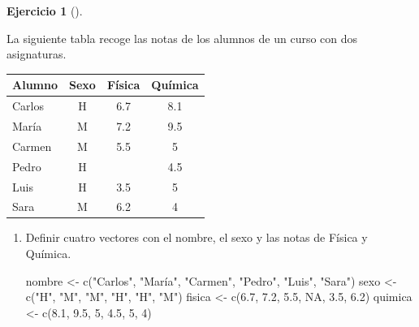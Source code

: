 \documentclass[
  a4paper,
]{scrreport}
\newenvironment{Shaded}{\begin{snugshade}}{\end{snugshade}}
\newcommand{\ConstantTok}[1]{\textcolor[rgb]{0.56,0.35,0.01}{#1}}
\newcommand{\DecValTok}[1]{\textcolor[rgb]{0.68,0.00,0.00}{#1}}
\newcommand{\FloatTok}[1]{\textcolor[rgb]{0.68,0.00,0.00}{#1}}
\newcommand{\FunctionTok}[1]{\textcolor[rgb]{0.28,0.35,0.67}{#1}}
\newcommand{\NormalTok}[1]{\textcolor[rgb]{0.00,0.23,0.31}{#1}}
\newcommand{\OtherTok}[1]{\textcolor[rgb]{0.00,0.23,0.31}{#1}}
\newcommand{\StringTok}[1]{\textcolor[rgb]{0.13,0.47,0.30}{#1}}
\theoremstyle{definition}
\newtheorem{exercise}{Ejercicio}[chapter]
\theoremstyle{remark}
\begin{document}
\begin{exercise}[]\protect\hypertarget{exr-preprocesaimento-5}{}\label{exr-preprocesaimento-5}

La siguiente tabla recoge las notas de los alumnos de un curso con dos
asignaturas.

\begin{longtable}[]{@{}lccc@{}}
\toprule\noalign{}
Alumno & Sexo & Física & Química \\
\midrule\noalign{}
\endhead
\bottomrule\noalign{}
\endlastfoot
Carlos & H & 6.7 & 8.1 \\
María & M & 7.2 & 9.5 \\
Carmen & M & 5.5 & 5 \\
Pedro & H & & 4.5 \\
Luis & H & 3.5 & 5 \\
Sara & M & 6.2 & 4 \\
\end{longtable}

\begin{enumerate}
\def\labelenumi{\alph{enumi}.}
\item
  Definir cuatro vectores con el nombre, el sexo y las notas de Física y
  Química.

  \begin{tcolorbox}[enhanced jigsaw, toprule=.15mm, rightrule=.15mm, arc=.35mm, colback=white, colbacktitle=quarto-callout-tip-color!10!white, toptitle=1mm, left=2mm, colframe=quarto-callout-tip-color-frame, opacityback=0, breakable, opacitybacktitle=0.6, bottomtitle=1mm, titlerule=0mm, title=\textcolor{quarto-callout-tip-color}{\faLightbulb}\hspace{0.5em}{Solución}, bottomrule=.15mm, coltitle=black, leftrule=.75mm]

\begin{Shaded}
\begin{Highlighting}[]
\NormalTok{nombre }\OtherTok{\textless{}{-}} \FunctionTok{c}\NormalTok{(}\StringTok{"Carlos"}\NormalTok{, }\StringTok{"María"}\NormalTok{, }\StringTok{"Carmen"}\NormalTok{, }\StringTok{"Pedro"}\NormalTok{, }\StringTok{"Luis"}\NormalTok{, }\StringTok{"Sara"}\NormalTok{)}
\NormalTok{sexo }\OtherTok{\textless{}{-}} \FunctionTok{c}\NormalTok{(}\StringTok{"H"}\NormalTok{, }\StringTok{"M"}\NormalTok{, }\StringTok{"M"}\NormalTok{, }\StringTok{"H"}\NormalTok{, }\StringTok{"H"}\NormalTok{, }\StringTok{"M"}\NormalTok{)}
\NormalTok{fisica }\OtherTok{\textless{}{-}} \FunctionTok{c}\NormalTok{(}\FloatTok{6.7}\NormalTok{, }\FloatTok{7.2}\NormalTok{, }\FloatTok{5.5}\NormalTok{, }\ConstantTok{NA}\NormalTok{, }\FloatTok{3.5}\NormalTok{, }\FloatTok{6.2}\NormalTok{)}
\NormalTok{quimica }\OtherTok{\textless{}{-}} \FunctionTok{c}\NormalTok{(}\FloatTok{8.1}\NormalTok{, }\FloatTok{9.5}\NormalTok{, }\DecValTok{5}\NormalTok{, }\FloatTok{4.5}\NormalTok{, }\DecValTok{5}\NormalTok{, }\DecValTok{4}\NormalTok{)}
\end{Highlighting}
\end{Shaded}


\end{tcolorbox}
\end{enumerate}
\end{exercise}
\end{document}
